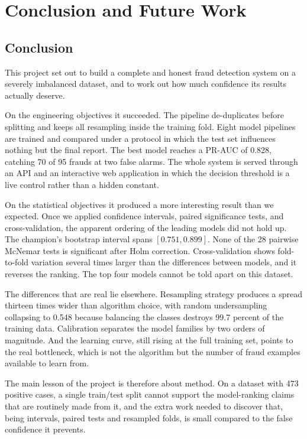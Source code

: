 \chapter{Conclusion and Future Work}
\label{ch:conclusion}

\section{Conclusion}

This project set out to build a complete and honest fraud detection system on a severely
imbalanced dataset, and to work out how much confidence its results actually deserve.

On the engineering objectives it succeeded. The pipeline de-duplicates before splitting and
keeps all resampling inside the training fold. Eight model pipelines are trained and
compared under a protocol in which the test set influences nothing but the final report. The
best model reaches a PR-AUC of 0.828, catching 70 of 95 frauds at two false alarms. The
whole system is served through an API and an interactive web application in which the
decision threshold is a live control rather than a hidden constant.

On the statistical objectives it produced a more interesting result than we expected. Once
we applied confidence intervals, paired significance tests, and cross-validation, the
apparent ordering of the leading models did not hold up. The champion's bootstrap interval
spans $[0.751, 0.899]$. None of the 28 pairwise McNemar tests is significant after Holm
correction. Cross-validation shows fold-to-fold variation several times larger than the
differences between models, and it reverses the ranking. The top four models cannot be told
apart on this dataset.

The differences that are real lie elsewhere. Resampling strategy produces a spread thirteen
times wider than algorithm choice, with random undersampling collapsing to 0.548 because
balancing the classes destroys 99.7 percent of the training data. Calibration separates the
model families by two orders of magnitude. And the learning curve, still rising at the full
training set, points to the real bottleneck, which is not the algorithm but the number of
fraud examples available to learn from.

The main lesson of the project is therefore about method. On a dataset with 473 positive
cases, a single train/test split cannot support the model-ranking claims that are routinely
made from it, and the extra work needed to discover that, being intervals, paired tests and
resampled folds, is small compared to the false confidence it prevents.

